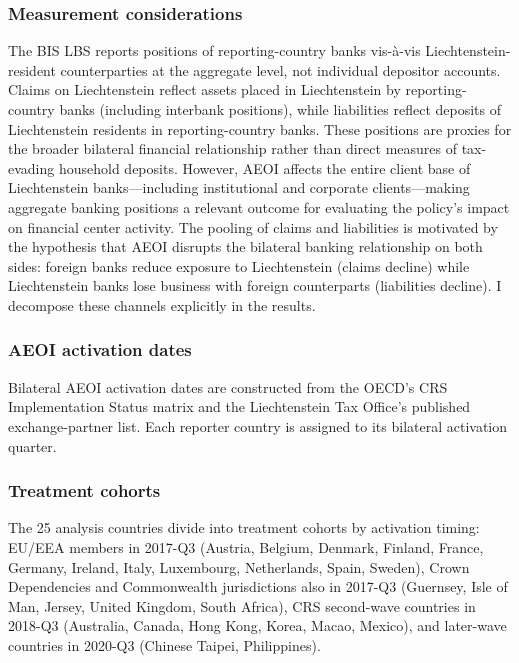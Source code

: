 \documentclass[12pt]{article}
\begin{document}
\subsubsection*{Measurement considerations} The BIS LBS reports positions of reporting-country banks vis-\`{a}-vis Liechtenstein-resident counterparties at the aggregate level, not individual depositor accounts. Claims on Liechtenstein reflect assets placed in Liechtenstein by reporting-country banks (including interbank positions), while liabilities reflect deposits of Liechtenstein residents in reporting-country banks. These positions are proxies for the broader bilateral financial relationship rather than direct measures of tax-evading household deposits. However, AEOI affects the entire client base of Liechtenstein banks---including institutional and corporate clients---making aggregate banking positions a relevant outcome for evaluating the policy's impact on financial center activity. The pooling of claims and liabilities is motivated by the hypothesis that AEOI disrupts the bilateral banking relationship on both sides: foreign banks reduce exposure to Liechtenstein (claims decline) while Liechtenstein banks lose business with foreign counterparts (liabilities decline). I decompose these channels explicitly in the results.

\subsubsection*{AEOI activation dates} Bilateral AEOI activation dates are constructed from the OECD's CRS Implementation Status matrix and the Liechtenstein Tax Office's published exchange-partner list. Each reporter country is assigned to its bilateral activation quarter.

\subsubsection*{Treatment cohorts} The 25 analysis countries divide into treatment cohorts by activation timing: EU/EEA members in 2017-Q3 (Austria, Belgium, Denmark, Finland, France, Germany, Ireland, Italy, Luxembourg, Netherlands, Spain, Sweden), Crown Dependencies and Commonwealth jurisdictions also in 2017-Q3 (Guernsey, Isle of Man, Jersey, United Kingdom, South Africa), CRS second-wave countries in 2018-Q3 (Australia, Canada, Hong Kong, Korea, Macao, Mexico), and later-wave countries in 2020-Q3 (Chinese Taipei, Philippines).


\end{document}
